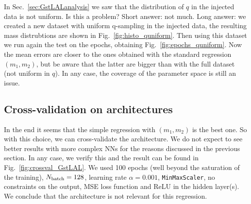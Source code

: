 \documentclass[prd,aps,twocolumn,a4paper,showkeys,nofootinbib]{revtex4-1}
\begin{document}
%
In Sec.~\ref{sec:GstLALanalysis} we saw that the distribution of $q$ in
the injected data is not uniform. Is this a problem?
Short answer: not much. 
Long answer: we created a new dataset with uniform q-sampling in the injected data, 
the resulting mass distrubtions are shown in Fig.~\ref{fig:histo_quniform}.
Then using this dataset we run again the test on the epochs, obtaining 
Fig.~\ref{fig:epochs_quniform}. Now the mean errors are closer to the ones
obtained with the standard regression $(m_1, m_2)$, but be aware that
the latter are bigger than with the full dataset (not uniform in $q$).
In any case, the coverage of the parameter space is still an issue. 

\subsection{Cross-validation on architectures}
In the end it seems that the simple regression with $(m_1, m_2)$ 
is the best one. So with this choice, we can cross-validate the architecture.
We do not expect to see better results with more complex NNs for the reasons
discussed in the previous section. In any case, we verify this and 
the result can be found in Fig.~\ref{fig:crossval_GstLAL}.
We used 100 epochs (well beyond the saturation of the training), $N_{\rm batch}=128$,
learning rate $\alpha =0.001$, \texttt{MinMaxScaler}, no constraints on the 
output, MSE loss function and ReLU in the hidden layer(s).
We conclude that the architecture is not relevant for this regression.
%
\end{document}
